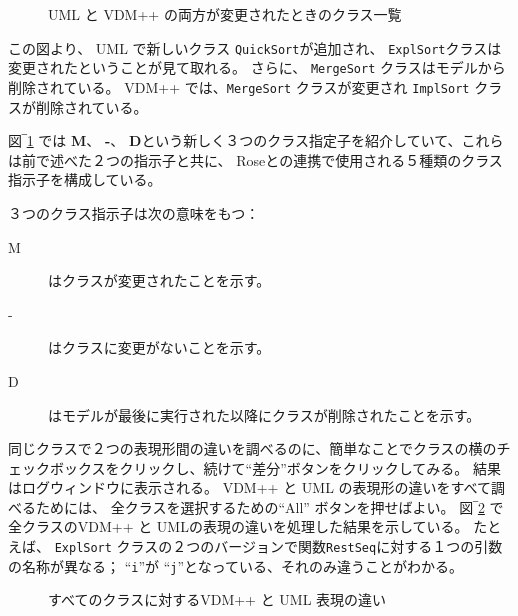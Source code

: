 \documentclass[\pformat,12pt]{jarticle}
\newcommand{\vdmpp}{VDM++}
\newcommand{\link}{Roseとの連携}
\begin{document}
\begin{figure}[htb]
\begin{center}
\mbox{}
\caption{UML と \vdmpp{} の両方が変更されたときのクラス一覧　\label{fig:mergeUMLVDM}}
\end{center}
\end{figure}

この図より、 UML で新しいクラス {\tt QuickSort}が追加され、 {\tt ExplSort}クラスは変更されたということが見て取れる。
さらに、 {\tt MergeSort} クラスはモデルから削除されている。
\vdmpp{} では、{\tt MergeSort} クラスが変更され {\tt ImplSort} クラスが削除されている。

図‾\ref{fig:mergeUMLVDM} では {\bf M}、 {\bf -}、 {\bf D}という新しく３つのクラス指定子を紹介していて、これらは前で述べた２つの指示子と共に、 \link{}で使用される５種類のクラス指示子を構成している。
 
３つのクラス指示子は次の意味をもつ：

\begin{description}  
\item [M] はクラスが変更されたことを示す。
\item [-] はクラスに変更がないことを示す。
\item [D] はモデルが最後に実行された以降にクラスが削除されたことを示す。
\end{description}  

同じクラスで２つの表現形間の違いを調べるのに、簡単なことでクラスの横のチェックボックスをクリックし、続けて``差分''ボタンをクリックしてみる。
結果はログウィンドウに表示される。
\vdmpp{} と UML の表現形の違いをすべて調べるためには、 全クラスを選択するための``All'' ボタンを押せばよい。
図‾\ref{fig:diffs} で全クラスの\vdmpp{} と UMLの表現の違いを処理した結果を示している。
たとえば、 {\tt ExplSort} クラスの２つのバージョンで関数{\tt RestSeq}に対する１つの引数の名称が異なる； ``{\tt i}''が ``{\tt j}''となっている、それのみ違うことがわかる。

\begin{figure}[htb]
\begin{center}
\mbox{}
\caption{すべてのクラスに対する\vdmpp{} と UML 表現の違い　\label{fig:diffs}}
\end{center}
\end{figure}
\end{document}
